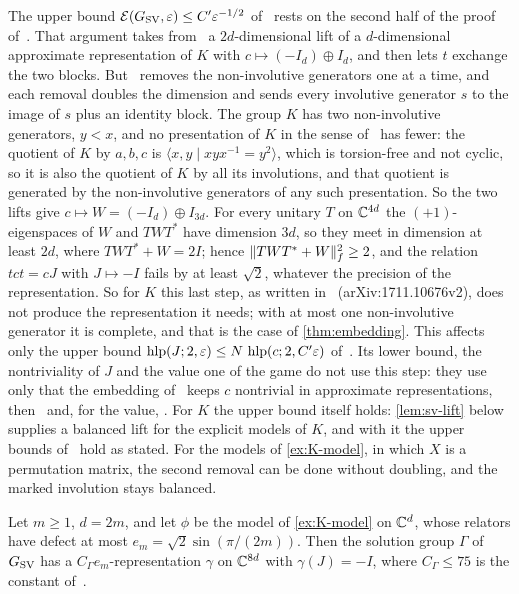 The upper bound $\mathcal E(G_{\mathrm{SV}},\varepsilon)\le C'\varepsilon^{-1/2}$ of~\cite[Theorem~1.1]{SV18} rests on the second half of the proof
of~\cite[Proposition~6.2]{SV18}. That argument takes from~\cite[Proposition~4.8]{Slo19} a $2d$-dimensional lift of a $d$-dimensional
approximate representation of $K$ with $c\mapsto(-I_d)\oplus I_d$, and then lets $t$ exchange the two blocks. But~\cite[Proposition~4.8]{Slo19}
removes the non-involutive generators one at a time, and each removal doubles the dimension and sends every involutive generator $s$ to
the image of $s$ plus an identity block. The group $K$ has two non-involutive generators, $y<x$, and no presentation of $K$ in
the sense of~\cite[\S6]{SV18} has fewer: the quotient of $K$ by $a,b,c$ is $\langle x,y\mid xyx^{-1}=y^2\rangle$, which is torsion-free and
not cyclic, so it is also the quotient of $K$ by all its involutions, and that quotient is generated by the non-involutive generators of
any such presentation. So the two lifts give $c\mapsto W=(-I_d)\oplus I_{3d}$. For every unitary $T$ on $\mathbb C^{4d}$ the $(+1)$-eigenspaces of $W$ and $TWT^*$ have dimension $3d$, so they
meet in dimension at least $2d$, where $TWT^*+W=2I$; hence $\lVert TWT^*+W\rVert_f^2\ge2$, and the relation $tct=cJ$ with $J\mapsto-I$ fails by at
least $\sqrt2$, whatever the precision of the representation. So for $K$ this last step, as written in~\cite{SV18} (arXiv:1711.10676v2), does not produce the
representation it needs; with at most one non-involutive generator it is complete, and that is the case of \cref{thm:embedding}. This
affects only the upper bound $\operatorname{hlp}(J;2,\varepsilon)\le N\,\operatorname{hlp}(c;2,C'\varepsilon)$ of~\cite[Prop.~6.2]{SV18}. Its lower bound, the nontriviality of $J$
and the value one of the game do not use this step: they use only that the embedding of~\cite[Prop.~4.8]{Slo19} keeps $c$ nontrivial in
approximate representations, then~\cite[Lemma~5.2 and Prop.~4.2]{Slo19} and, for the value, \cite[Cor.~5.3]{SV18}. For $K$ the upper
bound itself holds: \cref{lem:sv-lift} below supplies a balanced lift for the explicit models of $K$, and with it the upper bounds
of~\cite[Prop.~6.1 and Thm.~1.1]{SV18} hold as stated. For the models of \cref{ex:K-model}, in which $X$ is a permutation matrix, the second removal can be done without
doubling, and the marked involution stays balanced.

\begin{lemma}\label{lem:sv-lift}
Let $m\ge1$, $d=2m$, and let $\phi$ be the model of \cref{ex:K-model} on $\mathbb C^d$, whose relators have defect at most
$e_m=\sqrt2\sin(\pi/(2m))$. Then the solution group $\Gamma$ of $G_{\mathrm{SV}}$ has a $C_\Gamma e_m$-representation $\gamma$ on $\mathbb C^{8d}$ with
$\gamma(J)=-I$, where $C_\Gamma\le75$ is the constant of~\cite[Remark~4.5]{Slo19}.
\end{lemma}

